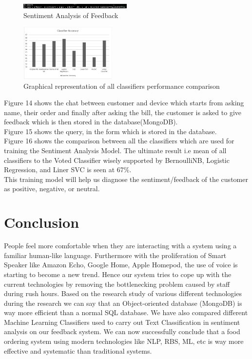 \documentclass[conference]{IEEEtran}
\begin{document}
	\begin{figure}[!ht]
		\centering
		\includegraphics[width=0.5\textwidth]{output.png}
		\caption{Sentiment Analysis of Feedback}
	\end{figure}
	
	\begin{figure}[!ht]
		\centering
		\includegraphics[width=0.43\textwidth]{R2.png}
		\caption{Graphical representation of all classifiers performance comparison}
	\end{figure}
	Figure 14 shows the chat between customer and device which starts from asking name, their order and finally after asking the bill, the customer is asked to give feedback which is then stored in the database(MongoDB).\\
	Figure 15 shows the query, in the form which is stored in the database.\\
	Figure 16 shows the comparison between all the classifiers which are used for training the Sentiment Analysis Model. The ultimate result i.e mean of all classifiers to the Voted Classifier wisely supported by BernoulliNB, Logistic Regression, and Liner SVC is seen at 67\%.\\
	This training model will help us diagnose the sentiment/feedback of the customer as positive, negative, or neutral.
	
	
	\section{Conclusion}
	People feel more comfortable when they are interacting with a system using a familiar human-like language. Furthermore with the proliferation of Smart Speaker like Amazon Echo, Google Home, Apple Homepod, the use of voice is starting to become a new trend. Hence our system tries to cope up with the current technologies by removing the bottlenecking problem caused by staff during rush hours. Based on the research study of various different technologies during the research we can say that an Object-oriented database (MongoDB) is way more efficient than a normal SQL database. We have also compared different Machine Learning Classifiers used to carry out Text Classification in sentiment analysis on our feedback system. We can now successfully conclude that a food ordering system using modern technologies like NLP, RBS, ML, etc is way more effective and systematic than traditional systems. 
	
\end{document}
